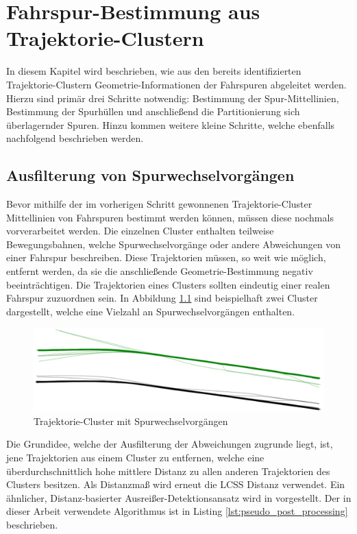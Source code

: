 
\chapter{Fahrspur-Bestimmung aus Trajektorie-Clustern}
\label{cha:lane_definition}

In diesem Kapitel wird beschrieben, wie aus den bereits identifizierten Trajektorie-Clustern
Geometrie-Informationen der Fahrspuren abgeleitet werden. Hierzu sind primär drei Schritte notwendig:
Bestimmung der Spur-Mittellinien, Bestimmung der Spurhüllen und anschließend die Partitionierung sich überlagernder
Spuren. Hinzu kommen weitere kleine Schritte, welche ebenfalls nachfolgend beschrieben werden.

\section{Ausfilterung von Spurwechselvorgängen}
\label{sec:real2_filter_lane_change}

Bevor mithilfe der im vorherigen Schritt gewonnenen Trajektorie-Cluster Mittellinien von Fahrspuren bestimmt
werden können, müssen diese nochmals vorverarbeitet werden. Die einzelnen Cluster enthalten teilweise
Bewegungsbahnen, welche Spurwechselvorgänge oder andere Abweichungen von einer Fahrspur beschreiben.
Diese Trajektorien müssen, so weit wie möglich,
entfernt werden, da sie die anschließende Geometrie-Bestimmung negativ beeinträchtigen. Die Trajektorien
eines Clusters sollten eindeutig einer realen Fahrspur zuzuordnen sein. In Abbildung
\ref{fig:real2_clusters_pre_postpro} sind beispielhaft zwei Cluster dargestellt, welche eine Vielzahl an
Spurwechselvorgängen enthalten.

\begin{figure}[H]
    \centering
    \includegraphics[width=0.8\linewidth]{resources/img/umsetzung/U2/Clusters_Pre_Postprocessing}
    \caption{Trajektorie-Cluster mit Spurwechselvorgängen}
    \label{fig:real2_clusters_pre_postpro}
\end{figure}

Die Grundidee, welche der Ausfilterung der Abweichungen zugrunde liegt, ist, jene Trajektorien
aus einem Cluster zu entfernen, welche eine überdurchschnittlich hohe mittlere Distanz zu allen anderen
Trajektorien des Clusters besitzen. Als Distanzmaß wird erneut die LCSS Distanz verwendet.
Ein ähnlicher, Distanz-basierter Ausreißer-Detektionsansatz wird in \cite[]{Mirge2017} vorgestellt.
Der in dieser Arbeit verwendete Algorithmus ist in Listing \ref{lst:pseudo_post_processing} beschrieben.

